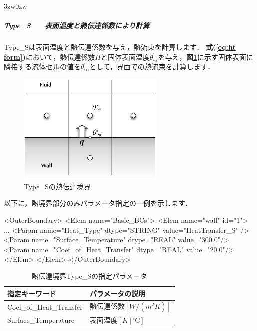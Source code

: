 \vspace{5mm}
\begin{indentation}{3zw}{0zw}

%
\subparagraph{Type\_S　　表面温度と熱伝達係数により計算}
Type\_Sは表面温度と熱伝達係数を与え，熱流束を計算します．
\textbf{式(\ref{eq:ht form})}において，熱伝達係数$H$と固体表面温度$\theta_{sf}^{\prime}$を与え，\textbf{図\ref{fig:HT_Type_S}}に示す固体表面に隣接する流体セルの値を$\theta_{\infty}^{\prime}$として，界面での熱流束を計算します．

\begin{figure}[htdp]
\begin{center}
\includegraphics[width=7cm,clip]{HeatTransfer_Type_S.eps}
\end{center}
\caption{Type\_Sの熱伝達境界}
\label{fig:HT_Type_S}
\end{figure}

以下に，熱境界部分のみパラメータ指定の一例を示します．

{\small
\begin{program}
<OuterBoundary>
  <Elem name="Basic_BCs">
    <Elem name="wall" id="1">
      ...
      <Param name="Heat_Type"             dtype="STRING" value="HeatTransfer_S" />
      <Param name="Surface_Temperature"   dtype="REAL"   value="300.0"/>
      <Param name="Coef_of_Heat_Transfer" dtype="REAL"   value="20.0"/>
    </Elem>
  </Elem>
</OuterBoundary>
\end{program}
}

\begin{table}[htdp]
\caption{熱伝達境界Type\_Sの指定パラメータ}
\begin{center}
\small
\begin{tabular}{ll} \toprule
指定キーワード & パラメータの説明\\ \midrule
Coef\_of\_Heat\_Transfer & 熱伝達係数$[W/(m^2K)]$\\
Surface\_Temperature & 表面温度$[K\,|\,{}^\circ\mathrm{C}]$\\
\bottomrule
\end{tabular}
\end{center}
\label{tbl:hts}
\end{table}


\end{indentation}
